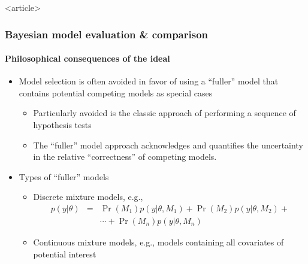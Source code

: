\documentclass[handout]{beamer}
\begin{document}
\begin{frame}<article>
  \frametitle{Bayesian model evaluation \& comparison}
  \framesubtitle{\large Philosophical consequences of the ideal}

  \begin{itemize}
  \item Model selection is often avoided in favor of using a
    ``fuller'' model that contains potential competing models as
    special cases
    \begin{itemize}
    \item Particularly avoided is the classic approach of performing a
      sequence of hypothesis tests
    \item The ``fuller'' model approach acknowledges and quantifies
      the uncertainty in the relative ``correctness'' of competing
      models.
    \end{itemize}
  \item Types of ``fuller'' models
    \begin{itemize}
    \item Discrete mixture models, e.g.,
      \begin{eqnarray*}
        p\left(y|\theta\right) &=& \Pr\left(M_1\right) p\left(y|\theta,M_1\right) + \Pr\left(M_2\right) p\left(y|\theta,M_2\right) +\\
        & & \cdots + \Pr\left(M_n\right) p\left(y|\theta,M_n\right) 
      \end{eqnarray*}
    \item Continuous mixture models, e.g., models containing all
      covariates of potential interest
    \end{itemize}
  \end{itemize}

\end{frame}
\end{document}
